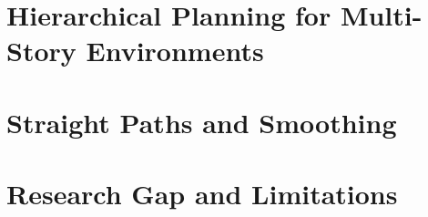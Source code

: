 \section{Hierarchical Planning for Multi-Story Environments}
\label{sec:hierarchical_planning}

\section{Straight Paths and Smoothing}
\label{sec:straight_paths}

\section{Research Gap and Limitations}
\label{sec:research_gap}
